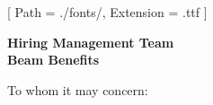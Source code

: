 


\renewcommand{\photo}[2]{}

\geometry{
  left=2cm,
  right=2cm,
  top=2cm,
  bottom=2cm
}



\makecvheader

\setmainfont{NotoSans-Regular}[
  Path = ./fonts/,
  Extension = .ttf
]

\vspace{1cm}
\indent\textbf{Hiring Management Team}\\
\indent\textbf{Beam Benefits}

\vspace{0.5cm}

\noindent To whom it may concern:

\vspace{0.5cm}


